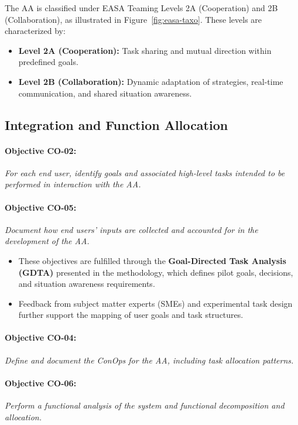 \documentclass[12pt,a4paper]{article} %
\begin{document}
	The AA is classified under EASA Teaming Levels 2A (Cooperation) and 2B (Collaboration), as illustrated in Figure~\ref{fig:easa-taxo}. These levels are characterized by:
	
	\begin{itemize}
	  \item \textbf{Level 2A (Cooperation):} Task sharing and mutual direction within predefined goals.
	  \item \textbf{Level 2B (Collaboration):} Dynamic adaptation of strategies, real-time communication, and shared situation awareness.
	\end{itemize}
	
	\subsection*{Integration and Function Allocation}
	
	\paragraph{Objective CO-02:} \textit{For each end user, identify goals and associated high-level tasks intended to be performed in interaction with the AA.}
	
	\paragraph{Objective CO-05:} \textit{Document how end users' inputs are collected and accounted for in the development of the AA.}
	
	\begin{itemize}
	  \item These objectives are fulfilled through the \textbf{Goal-Directed Task Analysis (GDTA)} presented in the methodology, which defines pilot goals, decisions, and situation awareness requirements. 
	  \item Feedback from subject matter experts (SMEs) and experimental task design further support the mapping of user goals and task structures.
	\end{itemize}
	
	\paragraph{Objective CO-04:} \textit{Define and document the ConOps for the AA, including task allocation patterns.}
	
	\paragraph{Objective CO-06:} \textit{Perform a functional analysis of the system and functional decomposition and allocation.}
	
\end{document}
